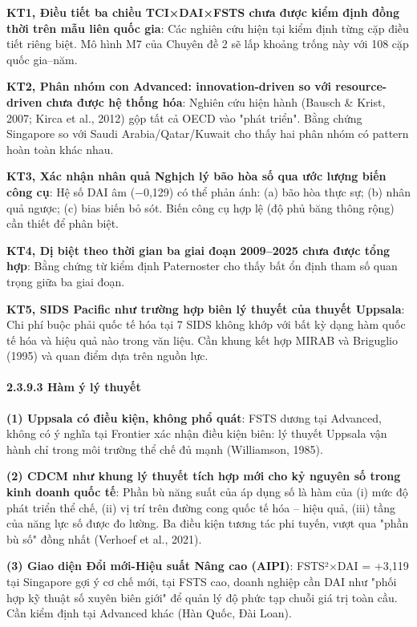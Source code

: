 \documentclass[12pt,a4paper]{article}
\begin{document}
\textbf{KT1, Điều tiết ba chiều TCI×DAI×FSTS chưa được kiểm định đồng
thời trên mẫu liên quốc gia}: Các nghiên cứu hiện tại kiểm định từng cặp
điều tiết riêng biệt. Mô hình M7 của Chuyên đề 2 sẽ lấp khoảng trống này
với 108 cặp quốc gia--năm.

\textbf{KT2, Phân nhóm con Advanced: innovation-driven so với
resource-driven chưa được hệ thống hóa}: Nghiên cứu hiện hành (Bausch \&
Krist, 2007; Kirca et al., 2012) gộp tất cả OECD vào "phát triển". Bằng
chứng Singapore so với Saudi Arabia/Qatar/Kuwait cho thấy hai phân nhóm
có pattern hoàn toàn khác nhau.

\textbf{KT3, Xác nhận nhân quả Nghịch lý bão hòa số qua ước lượng biến
công cụ}: Hệ số DAI âm (−0,129) có thể phản ánh: (a) bão hòa thực sự;
(b) nhân quả ngược; (c) bias biến bỏ sót. Biến công cụ hợp lệ (độ phủ
băng thông rộng) cần thiết để phân biệt.

\textbf{KT4, Dị biệt theo thời gian ba giai đoạn 2009--2025 chưa được
tổng hợp}: Bằng chứng từ kiểm định Paternoster cho thấy bất ổn định tham
số quan trọng giữa ba giai đoạn.

\textbf{KT5, SIDS Pacific như trường hợp biên lý thuyết của thuyết
Uppsala}: Chi phí buộc phải quốc tế hóa tại 7 SIDS không khớp với bất kỳ
dạng hàm quốc tế hóa và hiệu quả nào trong văn liệu. Cần khung kết hợp
MIRAB và Briguglio (1995) và quan điểm dựa trên nguồn lực.

\hypertarget{2393-huxe0m-uxfd-luxfd-thuyux1ebft}{%
\paragraph{2.3.9.3 Hàm ý lý
thuyết}\label{2393-huxe0m-uxfd-luxfd-thuyux1ebft}}

\textbf{(1) Uppsala có điều kiện, không phổ quát}: FSTS dương tại
Advanced, không có ý nghĩa tại Frontier xác nhận điều kiện biên: lý
thuyết Uppsala vận hành chỉ trong môi trường thể chế đủ mạnh
(Williamson, 1985).

\textbf{(2) CDCM như khung lý thuyết tích hợp mới cho kỷ nguyên số trong
kinh doanh quốc tế}: Phần bù năng suất của áp dụng số là hàm của (i) mức
độ phát triển thể chế, (ii) vị trí trên đường cong quốc tế hóa -- hiệu
quả, (iii) tầng của năng lực số được đo lường. Ba điều kiện tương tác
phi tuyến, vượt qua "phần bù số" đồng nhất (Verhoef et al., 2021).

\textbf{(3) Giao diện Đổi mới-Hiệu suất Nâng cao (AIPI)}: FSTS²×DAI =
+3,119 tại Singapore gợi ý cơ chế mới, tại FSTS cao, doanh nghiệp cần
DAI như "phối hợp kỹ thuật số xuyên biên giới" để quản lý độ phức tạp
chuỗi giá trị toàn cầu. Cần kiểm định tại Advanced khác (Hàn Quốc, Đài
Loan).
\end{document}
